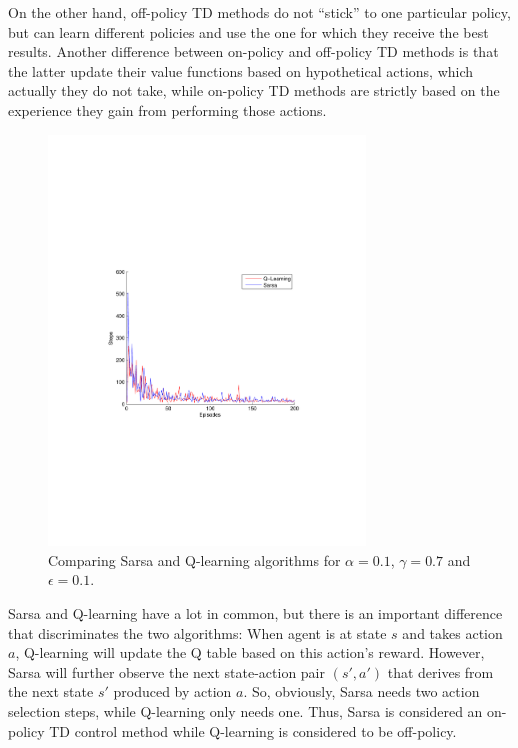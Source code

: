 \documentclass[a4paper,11pt]{article}
\begin{document}
On the other hand, off-policy TD methods do not ``stick'' to one particular policy, but can learn different policies and use the one for which they receive the best results. Another difference between on-policy and off-policy TD methods is that the latter update their value functions based on hypothetical actions, which actually they do not take, while on-policy TD methods are strictly based on the experience they gain from performing those actions.

\begin{figure}[t!]
  \centering
    \includegraphics[trim=4cm 8.5cm 4cm 8.5cm,clip,width=0.75\textwidth]{figures/sarsaQcomp01.pdf}
    \caption{Comparing Sarsa and Q-learning algorithms for $\alpha = 0.1$, $\gamma = 0.7$ and $\epsilon = 0.1$.}
    \label{sarsaQcomp01}
\end{figure}

Sarsa and Q-learning have a lot in common, but there is an important difference that discriminates the two algorithms: When agent is at state $s$ and takes action $a$, Q-learning will update the Q table based on this action's reward. However, Sarsa will further observe the next state-action pair $(s',a')$ that derives from the next state $s'$ produced by action $a$. So, obviously, Sarsa needs two action selection steps, while Q-learning only needs one. Thus, Sarsa is considered an on-policy TD control method while Q-learning is considered to be off-policy.
\end{document}
